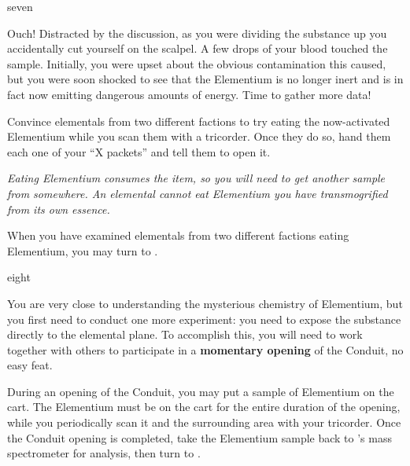 \documentclass[notebook]{elementals}
\begin{document}
\begin{page}{seven}

Ouch! Distracted by the discussion, as you were dividing the substance up you accidentally cut yourself on the scalpel. A few drops of your blood touched the sample. Initially, you were upset about the obvious contamination this caused, but you were soon shocked to see that the Elementium is no longer inert and is in fact now emitting dangerous amounts of energy. Time to gather more data!

Convince elementals from two different factions to try eating the now-activated Elementium while you scan them with a tricorder. Once they do so, hand them each one of your ``X packets'' and tell them to open it.

\emph{Eating Elementium consumes the item, so you will need to get another sample from somewhere. An elemental cannot eat Elementium you have transmogrified from its own essence.}

When you have examined elementals from two different factions eating Elementium, you may turn to .

\end{page}

\begin{page}{eight}

You are very close to understanding the mysterious chemistry of Elementium, but you first need to conduct one more experiment: you need to expose the substance directly to the elemental plane. To accomplish this, you will need to work together with others to participate in a \textbf{momentary opening} of the Conduit, no easy feat.

During an opening of the Conduit, you may put a sample of Elementium on the cart. The Elementium must be on the cart for the entire duration of the opening, while you periodically scan it and the surrounding area with your tricorder. Once the Conduit opening is completed, take the Elementium sample back to \cGD{}'s mass spectrometer for analysis, then turn to .

\end{page}
\end{document}
